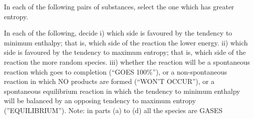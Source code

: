 \documentclass[fleqn]{exam}
\begin{document}
\begin{questions}
  \setcounter{question}{13}

  \question In each of the following pairs of substances, select the one which has greater entropy.

  \question In each of the following, decide
  \newline
  i) which side is favoured by the tendency to minimum enthalpy; that is, which side of the reaction the lower energy.
  \newline
  ii) which side is favoured by the tendency to maximum entropy; that is, which side of the reaction the more random species.
  \newline
  iii) whether the reaction will be
  \newline
  a spontaneous reaction which goes to completion (``GOES 100\%''), or
  \newline
  a non-spontaneous reaction in which NO products are formed (``WON'T OCCUR''), or
  \newline
  a spontaneous equilibrium reaction in which the tendency to minimum enthalpy will be balanced by an opposing tendency to maximum entropy (''EQUILIBRIUM'').
  \newline
  Note: in parts (a) to (d) all the species are GASES

  \begin{parts}

\end{parts}
\end{questions}
\end{document}
